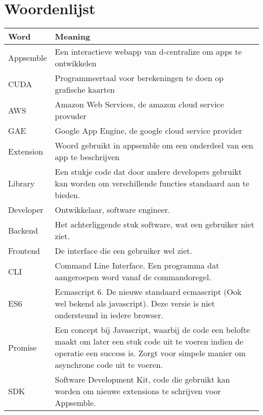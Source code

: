 \chapter{Woordenlijst}
\begin{tabular}{|p{3cm}|p{11cm}|}
	\hline
	\textbf{Word} & \textbf{Meaning} \\
	\hline
	Appsemble & Een interactieve webapp van d-centralize om apps te ontwikkelen\\ \hline
	CUDA & Programmeertaal voor berekeningen te doen op grafische kaarten \\ \hline
	AWS & Amazon Web Services, de amazon cloud service provuder \\ \hline
	GAE & Google App Engine, de google cloud service provider \\ \hline
	Extension & Woord gebruikt in appsemble om een onderdeel van een app te beschrijven \\ \hline
	Library & Een stukje code dat door andere developers gebruikt kan worden om verschillende functies standaard aan te bieden. \\ \hline
	Developer & Ontwikkelaar, software engineer. \\ \hline
	Backend & Het achterliggende stuk software, wat een gebruiker niet ziet. \\ \hline
	Frontend & De interface die een gebruiker wel ziet. \\ \hline
	CLI & Command Line Interface. Een programma dat aangeroepen word vanaf de commandoregel. \\ \hline	
	ES6 & Ecmascript 6. De nieuwe standaard ecmascript (Ook wel bekend als javascript). Deze versie is niet ondersteund in iedere browser. \\ \hline
	Promise & Een concept bij Javascript, waarbij de code een belofte maakt om later een stuk code uit te voeren indien de operatie een success is. Zorgt voor simpele manier om asynchrone code uit te voeren. \\ \hline
	SDK & Software Development Kit, code die gebruikt kan worden om nieuwe extensions te schrijven voor Appsemble. \\ \hline
\end{tabular}